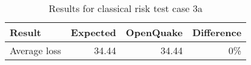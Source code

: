 \begin{table}[htbp]

\centering
\begin{tabular}{ l r r r }

\hline
\rowcolor{anti-flashwhite}
\bf{Result} & \bf{Expected} & \bf{OpenQuake} & \bf{Difference}\\
\hline
Average loss & 34.44 & 34.44 & 0\% \\
\hline
\end{tabular}

\caption{Results for classical risk test case 3a}
\label{tab:result-cr-3a}
\end{table}
